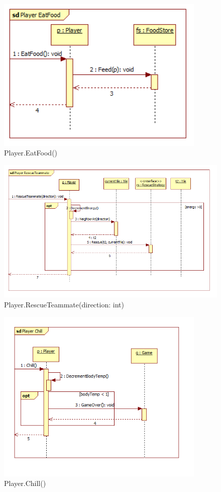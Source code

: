 \begin{figure}[H]
	\begin{center}
		\includegraphics[width=10cm]{chapters/chapter04/seqdiag/Player_EatFood.png}
		\caption{Player.EatFood()}
		\label{fig:PlayerEatFood}
	\end{center}
\end{figure}
\begin{figure}[H]
	\begin{center}
		\includegraphics[width=15cm]{chapters/chapter04/seqdiag/Player_RescueTeammate.png}
		\caption{Player.RescueTeammate(direction: int)}
		\label{fig:Player.RescueTeammate}
	\end{center}
\end{figure}
\begin{figure}[H]
	\begin{center}
		\includegraphics[width=10cm]{chapters/chapter04/seqdiag/Player_Chill.png}
		\caption{Player.Chill()}
		\label{fig:PlayerChill}
	\end{center}
\end{figure}
